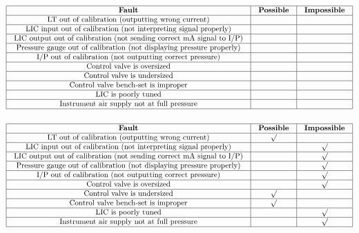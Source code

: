 $$\vbox{\offinterlineskip
\halign{\strut
\vrule \quad\hfil # \ \hfil & 
\vrule \quad\hfil # \ \hfil & 
\vrule \quad\hfil # \ \hfil \vrule \cr
\noalign{\hrule}
%
{\bf Fault} & {\bf Possible} & {\bf Impossible} \cr
%
\noalign{\hrule}
%
LT out of calibration (outputting wrong current) &  &  \cr
%
\noalign{\hrule}
%
LIC input out of calibration (not interpreting signal properly) &  &  \cr
%
\noalign{\hrule}
%
LIC output out of calibration (not sending correct mA signal to I/P) &  &  \cr
%
\noalign{\hrule}
%
Pressure gauge out of calibration (not displaying pressure properly) &  &  \cr
%
\noalign{\hrule}
%
I/P out of calibration (not outputting correct pressure) &  &  \cr
%
\noalign{\hrule}
%
Control valve is oversized &  &  \cr
%
\noalign{\hrule}
%
Control valve is undersized &  &  \cr
%
\noalign{\hrule}
%
Control valve bench-set is improper &  &  \cr
%
\noalign{\hrule}
%
LIC is poorly tuned &  &  \cr
%
\noalign{\hrule}
%
Instrument air supply not at full pressure &  &  \cr
%
\noalign{\hrule}
} %
}$$ %








$$\vbox{\offinterlineskip
\halign{\strut
\vrule \quad\hfil # \ \hfil & 
\vrule \quad\hfil # \ \hfil & 
\vrule \quad\hfil # \ \hfil \vrule \cr
\noalign{\hrule}
%
{\bf Fault} & {\bf Possible} & {\bf Impossible} \cr
%
\noalign{\hrule}
%
LT out of calibration (outputting wrong current) & $\surd$ &  \cr
%
\noalign{\hrule}
%
LIC input out of calibration (not interpreting signal properly) &  & $\surd$ \cr
%
\noalign{\hrule}
%
LIC output out of calibration (not sending correct mA signal to I/P) &  & $\surd$ \cr
%
\noalign{\hrule}
%
Pressure gauge out of calibration (not displaying pressure properly) &  & $\surd$ \cr
%
\noalign{\hrule}
%
I/P out of calibration (not outputting correct pressure) &  & $\surd$ \cr
%
\noalign{\hrule}
%
Control valve is oversized &  & $\surd$ \cr
%
\noalign{\hrule}
%
Control valve is undersized & $\surd$ &  \cr
%
\noalign{\hrule}
%
Control valve bench-set is improper & $\surd$ &  \cr
%
\noalign{\hrule}
%
LIC is poorly tuned &  & $\surd$ \cr
%
\noalign{\hrule}
%
Instrument air supply not at full pressure &  & $\surd$ \cr
%
\noalign{\hrule}
} %
}$$ %











